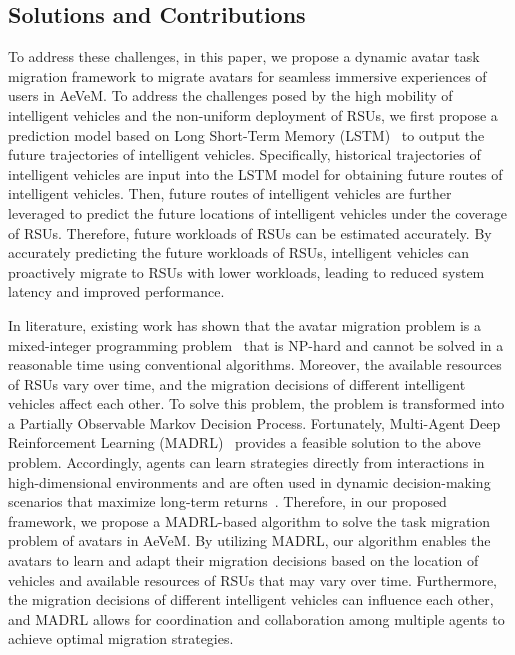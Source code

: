 \documentclass[lettersize,journal]{IEEEtran}
\begin{document}
\subsection{Solutions and Contributions}
To address these challenges, in this paper, we propose a dynamic avatar task migration framework to migrate avatars for seamless immersive experiences of users in AeVeM.
To address the challenges posed by the high mobility of intelligent vehicles and the non-uniform deployment of RSUs, we first propose a prediction model based on Long Short-Term Memory (LSTM)~\cite{hochreiter1997long} to output the future trajectories of intelligent vehicles. Specifically, historical trajectories of intelligent vehicles are input into the LSTM model for obtaining future routes of intelligent vehicles. Then, future routes of intelligent vehicles are further leveraged to predict the future locations of intelligent vehicles under the coverage of RSUs. Therefore, future workloads of RSUs can be estimated accurately. By accurately predicting the future workloads of RSUs, intelligent vehicles can proactively migrate to RSUs with lower workloads, leading to reduced system latency and improved performance.

In literature, existing work has shown that the avatar migration problem is a mixed-integer programming problem~\cite{sun2016primal} that is NP-hard and cannot be solved in a reasonable time using conventional algorithms. Moreover, the available resources of RSUs vary over time, and the migration decisions of different intelligent vehicles affect each other. To solve this problem, the problem is transformed into a Partially Observable Markov Decision Process. Fortunately, Multi-Agent Deep Reinforcement Learning (MADRL)~\cite{lowe2017multi} provides a feasible solution to the above problem. Accordingly, agents can learn strategies directly from interactions in high-dimensional environments and are often used in dynamic decision-making scenarios that maximize long-term returns~\cite{nguyen2020deep,zhang2023ai}. Therefore, in our proposed framework, we propose a MADRL-based algorithm to solve the task migration problem of avatars in AeVeM. By utilizing MADRL, our algorithm enables the avatars to learn and adapt their migration decisions based on the location of vehicles and available resources of RSUs that may vary over time. Furthermore, the migration decisions of different intelligent vehicles can influence each other, and MADRL allows for coordination and collaboration among multiple agents to achieve optimal migration strategies.
\end{document}

